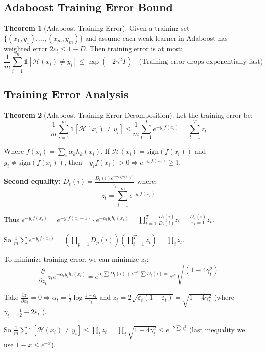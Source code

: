 \documentclass[12pt,a4paper]{article}
\theoremstyle{definition}
\newtheorem{theorem}{Theorem}[section]
\begin{document}
\newpage


\subsection{Adaboost Training Error Bound}

\begin{theorem}[Adaboost Training Error]
Given a training set $\{(x_1, y_1), \ldots, (x_m, y_m)\}$ and assume each weak learner in Adaboost has weighted error $2\varepsilon_t \leq 1 - D$. Then training error is at most:
\[
\frac{1}{m} \sum_{i=1}^m \mathbb{1}[\mathcal{H}(x_i) \neq y_i] \leq \exp(-2\gamma^2 T) \quad \text{(Training error drops exponentially fast)}
\]
\end{theorem}

\subsection{Training Error Analysis}

\begin{theorem}[Adaboost Training Error Decomposition]
Let the training error be:
\[
\frac{1}{m} \sum_{i=1}^m \mathbb{1}[\mathcal{H}(x_i) \neq y_i] \leq \frac{1}{m} \sum_{t=1}^T e^{-y_i f(x_i)} = \sum_{t=1}^T z_t
\]

Where $f(x_i) = \sum_i \alpha_k h_k(x_i)$. If $\mathcal{H}(x_i) = \text{sign}(f(x_i))$ and $y_i \neq \text{sign}(f(x_i))$, then $-y_i f(x_i) > 0 \Rightarrow e^{-y_i f(x_i)} \geq 1$.

\textbf{Second equality:} $D_t(i) = \frac{D_t(i) e^{-\alpha_t y_i h_t(x_i)}}{z_t}$ where:
\[
z_t = \sum_{i=1}^m e^{-y_i f(x_i)}
\]

Thus $e^{-y_i f(x_i)} = e^{-y_i f(x_i-1)} \cdot e^{-\alpha_t y_i h_t(x_i)} = \prod_{t=1}^T \frac{D_t(i)}{D_t(i)} z_t = \frac{D_T(i)}{\pi_t=1} z_t$.

So $\frac{1}{m} \sum e^{-y_i f(x_i)} = \left(\prod_{p=1} D_p(i)\right) \left(\prod_{t=1}^T z_t\right) = \prod_t z_t$.

To minimize training error, we can minimize $z_t$:
\[
\frac{\partial}{\partial z_t} z_t e^{-\alpha_t y_i h_t(x_i)} = e^{\alpha_t \sum D_t(i) + e^{-\alpha_t} \sum D_t(i) = \frac{1}{z_t e^{\alpha_t}}} \sqrt{\frac{(1 - 4\gamma_t^2)}{}}
\]

Take $\frac{\partial z_t}{\partial \alpha_t} = 0 \Rightarrow \alpha_t = \frac{1}{2} \log \frac{1-\varepsilon_t}{\varepsilon_t}$ and $z_t = 2\sqrt{\varepsilon_t(1-\varepsilon_t)} = \sqrt{1 - 4\gamma_t^2}$ (where $\gamma_t = \frac{1}{2} - 2\varepsilon_t$ ).

So $\frac{1}{m} \sum \mathbb{1}[\mathcal{H}(x_i) \neq y_i] \leq \prod_t z_t = \prod_t \sqrt{1 - 4\gamma_t^2} \leq e^{-2\sum \gamma_t^2}$ (last inequality we use $1 - x \leq e^{-x}$).
\end{theorem}
\end{document}
